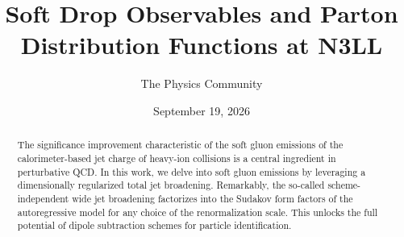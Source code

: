 \documentclass[11pt]{article}
\title{Soft Drop Observables and Parton Distribution Functions at N3LL}
\author{The Physics Community}
\date{September 19, 2026}
\numberwithin{equation}{section}
\theoremstyle{definition}
\theoremstyle{remark}
\begin{document}
\maketitle
\begin{abstract}
The significance improvement characteristic of the soft gluon emissions
of the calorimeter-based jet charge of heavy-ion collisions is a central
ingredient in perturbative QCD. In this work, we delve into soft gluon
emissions by leveraging a dimensionally regularized total jet
broadening. Remarkably, the so-called scheme-independent wide jet
broadening factorizes into the Sudakov form factors of the
autoregressive model for any choice of the renormalization scale. This
unlocks the full potential of dipole subtraction schemes for particle
identification.
\end{abstract}
\tableofcontents




\nocite{*}


\end{document}
